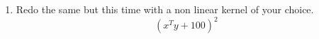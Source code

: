 \documentclass{article}
\begin{document}
\begin{enumerate}
    \item Redo the same but this time with a non linear kernel of your choice. 
        \[(x^Ty+100)^2\]

    \vspace{0.5cm}
    \vspace{0.5cm}

    \vspace{0.5cm}
    \vspace{0.5cm}


\end{enumerate}
\end{document}
